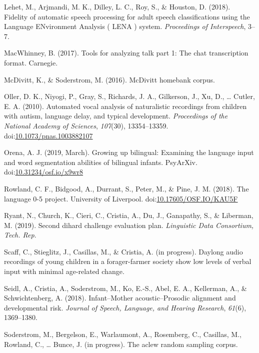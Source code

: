 \documentclass[english,floatsintext,man]{apa6}
\begin{document}
\hypertarget{ref-Lehet2018}{}
Lehet, M., Arjmandi, M. K., Dilley, L. C., Roy, S., \& Houston, D.
(2018). Fidelity of automatic speech processing for adult speech
classifications using the Language ENvironment Analysis ( LENA ) system.
\emph{Proceedings of Interspeech}, 3--7.

\hypertarget{ref-macwhinney2017tools}{}
MacWhinney, B. (2017). Tools for analyzing talk part 1: The chat
transcription format. Carnegie.

\hypertarget{ref-mcdivitt2016mcdivitt}{}
McDivitt, K., \& Soderstrom, M. (2016). McDivitt homebank corpus.

\hypertarget{ref-Oller}{}
Oller, D. K., Niyogi, P., Gray, S., Richards, J. A., Gilkerson, J., Xu,
D., \ldots{} Cutler, E. A. (2010). Automated vocal analysis of
naturalistic recordings from children with autism, language delay, and
typical development. \emph{Proceedings of the National Academy of
Sciences}, \emph{107}(30), 13354--13359.
doi:\href{https://doi.org/10.1073/pnas.1003882107}{10.1073/pnas.1003882107}

\hypertarget{ref-orena_2019}{}
Orena, A. J. (2019, March). Growing up bilingual: Examining the language
input and word segmentation abilities of bilingual infants. PsyArXiv.
doi:\href{https://doi.org/10.31234/osf.io/x9wr8}{10.31234/osf.io/x9wr8}

\hypertarget{ref-rowland2018}{}
Rowland, C. F., Bidgood, A., Durrant, S., Peter, M., \& Pine, J. M.
(2018). The language 0-5 project. University of Liverpool.
doi:\href{https://doi.org/10.17605/OSF.IO/KAU5F}{10.17605/OSF.IO/KAU5F}

\hypertarget{ref-ryant2019second}{}
Ryant, N., Church, K., Cieri, C., Cristia, A., Du, J., Ganapathy, S., \&
Liberman, M. (2019). Second dihard challenge evaluation plan.
\emph{Linguistic Data Consortium, Tech. Rep}.

\hypertarget{ref-scaff}{}
Scaff, C., Stieglitz, J., Casillas, M., \& Cristia, A. (in progress).
Daylong audio recordings of young children in a forager-farmer society
show low levels of verbal input with minimal age-related change.

\hypertarget{ref-Seidl2018}{}
Seidl, A., Cristia, A., Soderstrom, M., Ko, E.-S., Abel, E. A.,
Kellerman, A., \& Schwichtenberg, A. (2018). Infant--Mother
acoustic--Prosodic alignment and developmental risk. \emph{Journal of
Speech, Language, and Hearing Research}, \emph{61}(6), 1369--1380.

\hypertarget{ref-soderstrom}{}
Soderstrom, M., Bergelson, E., Warlaumont, A., Rosemberg, C., Casillas,
M., Rowland, C., \ldots{} Bunce, J. (in progress). The aclew random
sampling corpus.
\end{document}
